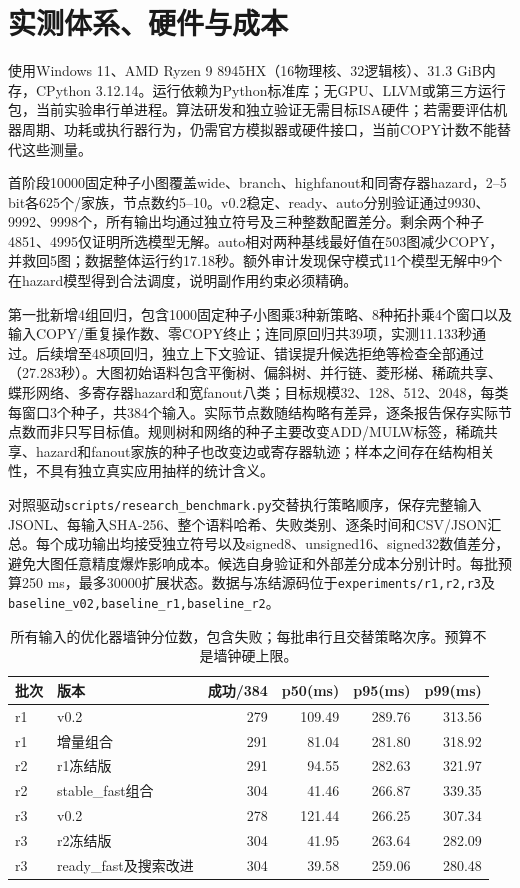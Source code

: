 \documentclass[UTF8,11pt,fontset=fandol]{ctexart}
\begin{document}
\section{实测体系、硬件与成本}
使用Windows 11、AMD Ryzen 9 8945HX（16物理核、32逻辑核）、31.3 GiB内存，CPython 3.12.14。运行依赖为Python标准库；无GPU、LLVM或第三方运行包，当前实验串行单进程。算法研发和独立验证无需目标ISA硬件；若需要评估机器周期、功耗或执行器行为，仍需官方模拟器或硬件接口，当前COPY计数不能替代这些测量。

首阶段10000固定种子小图覆盖wide、branch、highfanout和同寄存器hazard，2--5 bit各625个/家族，节点数约5--10。v0.2稳定、ready、auto分别验证通过9930、9992、9998个，所有输出均通过独立符号及三种整数配置差分。剩余两个种子4851、4995仅证明所选模型无解。auto相对两种基线最好值在503图减少COPY，并救回5图；数据整体运行约17.18秒。额外审计发现保守模式11个模型无解中9个在hazard模型得到合法调度，说明副作用约束必须精确。

第一批新增4组回归，包含1000固定种子小图乘3种新策略、8种拓扑乘4个窗口以及输入COPY/重复操作数、零COPY终止；连同原回归共39项，实测11.133秒通过。后续增至48项回归，独立上下文验证、错误提升候选拒绝等检查全部通过（27.283秒）。大图初始语料包含平衡树、偏斜树、并行链、菱形梯、稀疏共享、蝶形网络、多寄存器hazard和宽fanout八类；目标规模32、128、512、2048，每类每窗口3个种子，共384个输入。实际节点数随结构略有差异，逐条报告保存实际节点数而非只写目标值。规则树和网络的种子主要改变ADD/MULW标签，稀疏共享、hazard和fanout家族的种子也改变边或寄存器轨迹；样本之间存在结构相关性，不具有独立真实应用抽样的统计含义。

对照驱动\texttt{scripts/research\_benchmark.py}交替执行策略顺序，保存完整输入JSONL、每输入SHA-256、整个语料哈希、失败类别、逐条时间和CSV/JSON汇总。每个成功输出均接受独立符号以及signed8、unsigned16、signed32数值差分，避免大图任意精度爆炸影响成本。候选自身验证和外部差分成本分别计时。每批预算250 ms，最多30000扩展状态。数据与冻结源码位于\texttt{experiments/r1,r2,r3}及\texttt{baseline\_v02,baseline\_r1,baseline\_r2}。

\begin{table}[htbp]\centering\small
\begin{tabular}{llrrrr}\toprule
批次 & 版本 & 成功/384 & p50(ms) & p95(ms) & p99(ms)\\\midrule
r1 & v0.2 &279&109.49&289.76&313.56\\
r1 & 增量组合 &291&81.04&281.80&318.92\\
r2 & r1冻结版 &291&94.55&282.63&321.97\\
r2 & stable\_fast组合 &304&41.46&266.87&339.35\\
r3 & v0.2 &278&121.44&266.25&307.34\\
r3 & r2冻结版 &304&41.95&263.64&282.09\\
r3 & ready\_fast及搜索改进 &304&39.58&259.06&280.48\\\bottomrule
\end{tabular}
\caption{所有输入的优化器墙钟分位数，包含失败；每批串行且交替策略次序。预算不是墙钟硬上限。}\end{table}
\end{document}
